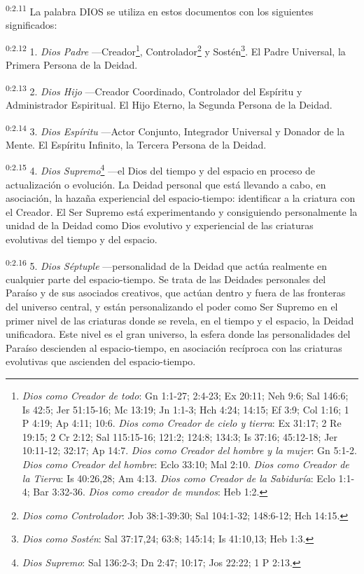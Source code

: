 \par
\textsuperscript{0:2.11} La palabra DIOS se utiliza en estos documentos con los siguientes significados:

\par
\textsuperscript{0:2.12} 1. \textit{Dios Padre} ---Creador\footnote{\textit{Dios como Creador de todo}: Gn 1:1-27; 2:4-23; Ex 20:11; Neh 9:6; Sal 146:6; Is 42:5; Jer 51:15-16; Mc 13:19; Jn 1:1-3; Hch 4:24; 14:15; Ef 3:9; Col 1:16; 1 P 4:19; Ap 4:11; 10:6. \textit{Dios como Creador de cielo y tierra}: Ex 31:17; 2 Re 19:15; 2 Cr 2:12; Sal 115:15-16; 121:2; 124:8; 134:3; Is 37:16; 45:12-18; Jer 10:11-12; 32:17; Ap 14:7. \textit{Dios como Creador del hombre y la mujer}: Gn 5:1-2. \textit{Dios como Creador del hombre}: Eclo 33:10; Mal 2:10. \textit{Dios como Creador de la Tierra}: Is 40:26,28; Am 4:13. \textit{Dios como Creador de la Sabiduría}: Eclo 1:1-4; Bar 3:32-36. \textit{Dios como creador de mundos}: Heb 1:2.}, Controlador\footnote{\textit{Dios como Controlador}: Job 38:1-39:30; Sal 104:1-32; 148:6-12; Hch 14:15.} y Sostén\footnote{\textit{Dios como Sostén}: Sal 37:17,24; 63:8; 145:14; Is 41:10,13; Heb 1:3.}. El Padre Universal, la Primera Persona de la Deidad.

\par
\textsuperscript{0:2.13} 2. \textit{Dios Hijo} ---Creador Coordinado, Controlador del Espíritu y Administrador Espiritual. El Hijo Eterno, la Segunda Persona de la Deidad.

\par
\textsuperscript{0:2.14} 3. \textit{Dios Espíritu} ---Actor Conjunto, Integrador Universal y Donador de la Mente. El Espíritu Infinito, la Tercera Persona de la Deidad.

\par
\textsuperscript{0:2.15} 4. \textit{Dios Supremo}\footnote{\textit{Dios Supremo}: Sal 136:2-3; Dn 2:47; 10:17; Jos 22:22; 1 P 2:13.} ---el Dios del tiempo y del espacio en proceso de actualización o evolución. La Deidad personal que está llevando a cabo, en asociación, la hazaña experiencial del espacio-tiempo: identificar a la criatura con el Creador. El Ser Supremo está experimentando y consiguiendo personalmente la unidad de la Deidad como Dios evolutivo y experiencial de las criaturas evolutivas del tiempo y del espacio.

\par
\textsuperscript{0:2.16} 5. \textit{Dios Séptuple} ---personalidad de la Deidad que actúa realmente en cualquier parte del espacio-tiempo. Se trata de las Deidades personales del Paraíso y de sus asociados creativos, que actúan dentro y fuera de las fronteras del universo central, y están personalizando el poder como Ser Supremo en el primer nivel de las criaturas donde se revela, en el tiempo y el espacio, la Deidad unificadora. Este nivel es el gran universo, la esfera donde las personalidades del Paraíso descienden al espacio-tiempo, en asociación recíproca con las criaturas evolutivas que ascienden del espacio-tiempo.

